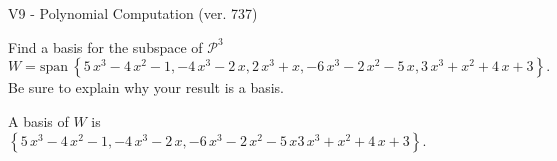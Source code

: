 \begin{exercise}
  \begin{exerciseTitle}V9 - Polynomial Computation (ver. 737)\end{exerciseTitle}
  \begin{exerciseStatement}
    Find a basis for the subspace of \(\mathcal{P}^3\) 
\[W=\mathrm{span}\ \left\{5 \, x^{3} - 4 \, x^{2} - 1 , -4 \, x^{3} - 2 \, x , 2 \, x^{3} + x , -6 \, x^{3} - 2 \, x^{2} - 5 \, x , 3 \, x^{3} + x^{2} + 4 \, x + 3\right\}.\]
 Be sure to explain why your result is a basis.


  \end{exerciseStatement}
  \begin{exerciseAnswer}
   A basis of \(W\) is  \(\left\{5 \, x^{3} - 4 \, x^{2} - 1 , -4 \, x^{3} - 2 \, x , -6 \, x^{3} - 2 \, x^{2} - 5 \, x 3 \, x^{3} + x^{2} + 4 \, x + 3\right\}\).
  


  \end{exerciseAnswer}
\end{exercise}